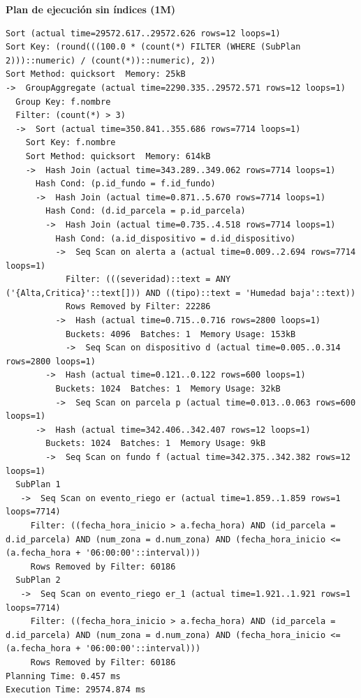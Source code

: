 \documentclass[11pt,letterpaper]{article}
\begin{document}
\textbf{Plan de ejecución sin índices (1M)}
\begin{lstlisting}[style=plano]
Sort (actual time=29572.617..29572.626 rows=12 loops=1)
Sort Key: (round(((100.0 * (count(*) FILTER (WHERE (SubPlan 2)))::numeric) / (count(*))::numeric), 2))
Sort Method: quicksort  Memory: 25kB
->  GroupAggregate (actual time=2290.335..29572.571 rows=12 loops=1)
  Group Key: f.nombre
  Filter: (count(*) > 3)
  ->  Sort (actual time=350.841..355.686 rows=7714 loops=1)
    Sort Key: f.nombre
    Sort Method: quicksort  Memory: 614kB
    ->  Hash Join (actual time=343.289..349.062 rows=7714 loops=1)
      Hash Cond: (p.id_fundo = f.id_fundo)
      ->  Hash Join (actual time=0.871..5.670 rows=7714 loops=1)
        Hash Cond: (d.id_parcela = p.id_parcela)
        ->  Hash Join (actual time=0.735..4.518 rows=7714 loops=1)
          Hash Cond: (a.id_dispositivo = d.id_dispositivo)
          ->  Seq Scan on alerta a (actual time=0.009..2.694 rows=7714 loops=1)
            Filter: (((severidad)::text = ANY ('{Alta,Critica}'::text[])) AND ((tipo)::text = 'Humedad baja'::text))
            Rows Removed by Filter: 22286
          ->  Hash (actual time=0.715..0.716 rows=2800 loops=1)
            Buckets: 4096  Batches: 1  Memory Usage: 153kB
            ->  Seq Scan on dispositivo d (actual time=0.005..0.314 rows=2800 loops=1)
        ->  Hash (actual time=0.121..0.122 rows=600 loops=1)
          Buckets: 1024  Batches: 1  Memory Usage: 32kB
          ->  Seq Scan on parcela p (actual time=0.013..0.063 rows=600 loops=1)
      ->  Hash (actual time=342.406..342.407 rows=12 loops=1)
        Buckets: 1024  Batches: 1  Memory Usage: 9kB
        ->  Seq Scan on fundo f (actual time=342.375..342.382 rows=12 loops=1)
  SubPlan 1
   ->  Seq Scan on evento_riego er (actual time=1.859..1.859 rows=1 loops=7714)
     Filter: ((fecha_hora_inicio > a.fecha_hora) AND (id_parcela = d.id_parcela) AND (num_zona = d.num_zona) AND (fecha_hora_inicio <= (a.fecha_hora + '06:00:00'::interval)))
     Rows Removed by Filter: 60186
  SubPlan 2
   ->  Seq Scan on evento_riego er_1 (actual time=1.921..1.921 rows=1 loops=7714)
     Filter: ((fecha_hora_inicio > a.fecha_hora) AND (id_parcela = d.id_parcela) AND (num_zona = d.num_zona) AND (fecha_hora_inicio <= (a.fecha_hora + '06:00:00'::interval)))
     Rows Removed by Filter: 60186
Planning Time: 0.457 ms
Execution Time: 29574.874 ms
\end{lstlisting}
\end{document}
